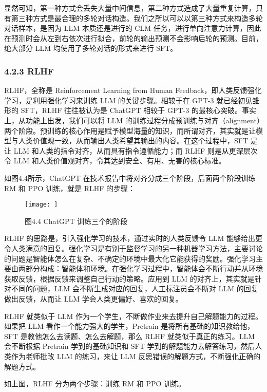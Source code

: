 \documentclass[12pt,a4paper]{book}
\begin{document}
显然可知，第一种方式会丢失大量中间信息，第二种方式造成了大量重复计算，只有第三种方式是最合理的多轮对话构造。我们之所以可以以第三种方式来构造多轮对话样本，是因为
LLM 本质还是进行的 CLM
任务，进行单向注意力计算，因此在预测时会从左到右依次进行拟合，前轮的输出预测不会影响后轮的预测。目前，绝大部分
LLM 均使用了多轮对话的形式来进行 SFT。

\subsubsection{4.2.3 RLHF}\label{rlhf}

RLHF，全称是 Reinforcement Learning from Human
Feedback，即人类反馈强化学习，是利用强化学习来训练 LLM
的关键步骤。相较于在 GPT-3 就已经初见雏形的 SFT，RLHF 往往被认为是
ChatGPT 相较于 GPT-3 的最核心突破。事实上，从功能上出发，我们可以将 LLM
的训练过程分成预训练与对齐（alignment）两个阶段。预训练的核心作用是赋予模型海量的知识，而所谓对齐，其实就是让模型与人类价值观一致，从而输出人类希望其输出的内容。在这个过程中，SFT
是让 LLM 和人类的指令对齐，从而具有指令遵循能力；而 RLHF
则是从更深层次令 LLM
和人类价值观对齐，令其达到安全、有用、无害的核心标准。

如图4.4所示，ChatGPT 在技术报告中将对齐分成三个阶段，后面两个阶段训练 RM
和 PPO 训练，就是 RLHF 的步骤：

\begin{figure}[htbp]\centering
\texttt{[image: ]}
\caption{图4.4 ChatGPT 训练三个的阶段}
\end{figure}

RLHF 的思路是，引入强化学习的技术，通过实时的人类反馈令 LLM
能够给出更令人类满意的回复。强化学习是有别于监督学习的另一种机器学习方法，主要讨论的问题是智能体怎么在复杂、不确定的环境中最大化它能获得的奖励。强化学习主要由两部分构成：智能体和环境。在强化学习过程中，智能体会不断行动并从环境获取反馈，根据反馈来调整自己行动的策略。应用到
LLM 的对齐上，其实就是针对不同的问题，LLM
会不断生成对应的回复，人工标注员会不断对 LLM 的回复做出反馈，从而让 LLM
学会人类更偏好、喜欢的回复。

RLHF 就类似于 LLM
作为一个学生，不断做作业来去提升自己解题能力的过程。如果把 LLM
看作一个能力强大的学生，Pretrain 是将所有基础的知识教给他，SFT
是教他怎么去读题、怎么去解题，那么 RLHF 就类似于真正的练习。LLM
会不断根据 Pretrain 学到的基础知识和 SFT
学到的解题能力去解答练习，然后人类作为老师批改 LLM 的练习，来让 LLM
反思错误的解题方式，不断强化正确的解题方式。

如上图，RLHF 分为两个步骤：训练 RM 和 PPO 训练。
\end{document}
